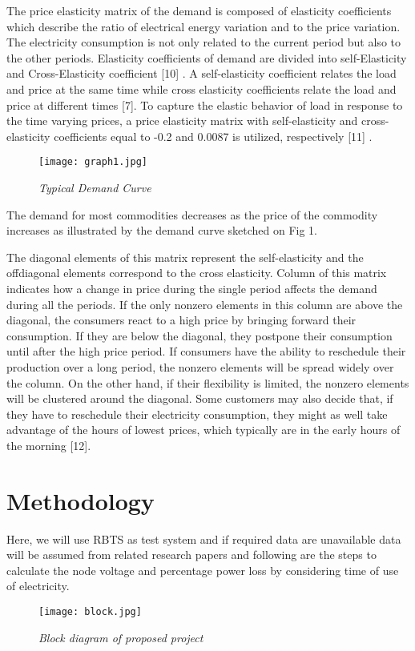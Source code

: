 \documentclass[14 pt]{article}
\begin{document}
The price elasticity matrix of the demand is composed of elasticity coefficients
which describe the ratio of electrical energy variation and to the price variation.
The electricity consumption is not only related to the current period but also to the
other periods. Elasticity coefficients of demand are divided into self-Elasticity and
Cross-Elasticity coefficient [10] . A self-elasticity coefficient relates the load and
price at the same time while cross elasticity coefficients relate the load and price at
different times [7]. To capture the elastic behavior of load in response to the time
varying prices, a price elasticity matrix with self-elasticity and cross-elasticity coefficients equal to -0.2 and 0.0087 is utilized, respectively [11] .
\begin{figure}[H]
\centering
\texttt{[image: graph1.jpg]}
\caption{\textit{Typical Demand Curve}}
\end{figure}
The demand for most commodities decreases as the price of the commodity
increases as illustrated by the demand curve sketched on Fig 1.

\vspace{0.8cm}
The diagonal elements of this matrix represent the self-elasticity and the offdiagonal elements correspond to the cross elasticity. Column of this matrix indicates how a change in price during the single period affects the demand during all
the periods. If the only nonzero elements in this column are above the diagonal,
the consumers react to a high price by bringing forward their consumption. If they
are below the diagonal, they postpone their consumption until after the high price
period. If consumers have the ability to reschedule their production over a long
period, the nonzero elements will be spread widely over the column. On the other
hand, if their flexibility is limited, the nonzero elements will be clustered around the diagonal. Some customers may also decide that, if they have to reschedule
their electricity consumption, they might as well take advantage of the hours of
lowest prices, which typically are in the early hours of the morning [12].
\pagebreak
\section{Methodology}
Here, we will use RBTS as test system and if required data are unavailable data
will be assumed from related research papers and following are the steps to calculate the node voltage and percentage power loss by considering time of use of
electricity.
\begin{figure}[H]
\centering
\texttt{[image: block.jpg]}
\caption{\textit{Block diagram of proposed project}}
\end{figure}
\pagebreak
\end{document}
